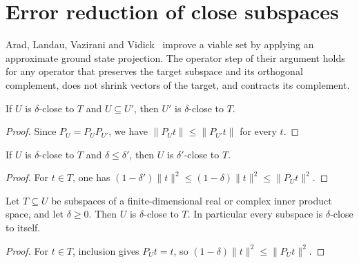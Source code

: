 \section{Error reduction of close subspaces}

Arad, Landau, Vazirani and Vidick~\cite[Lemma~l:er]{Arad2016RigorousRG}
improve a viable set by applying an approximate ground state projection.
The operator step of their argument holds for any operator that preserves
the target subspace and its orthogonal complement, does not shrink vectors
of the target, and contracts its complement.

\begin{theorem}
    \label{thm:subspace_close_mono}
    \leanok
    If $U$ is $\delta$-close to $T$ and $U\subseteq U'$, then $U'$ is
    $\delta$-close to $T$.
\end{theorem}

\begin{proof}
    \leanok
    Since $P_U=P_UP_{U'}$, we have
    $\lVert P_Ut\rVert\le\lVert P_{U'}t\rVert$ for every $t$.
\end{proof}

\begin{theorem}
    \label{thm:subspace_close_parameter_order}
    \leanok
    If $U$ is $\delta$-close to $T$ and $\delta\le\delta'$, then $U$ is
    $\delta'$-close to $T$.
\end{theorem}
\begin{proof}\leanok
    For $t\in T$, one has
    $(1-\delta')\|t\|^2\le(1-\delta)\|t\|^2\le\|P_Ut\|^2$.
\end{proof}

\begin{theorem}
    \label{thm:subspace_close_of_inclusion}
    \leanok
    Let $T\subseteq U$ be subspaces of a finite-dimensional real or
    complex inner product space, and let $\delta\ge0$.
    Then $U$ is $\delta$-close to $T$. In particular every subspace is
    $\delta$-close to itself.
\end{theorem}
\begin{proof}\leanok
    For $t\in T$, inclusion gives $P_Ut=t$, so
    $(1-\delta)\|t\|^2\le\|P_Ut\|^2$.
\end{proof}

